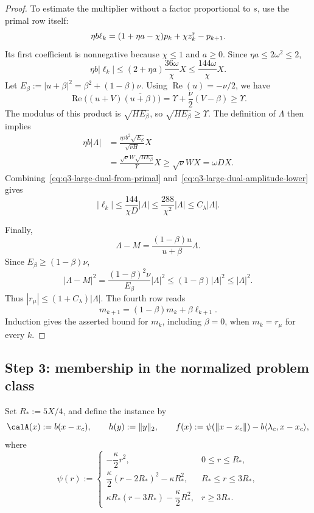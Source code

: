 \begin{proof}
To estimate the multiplier without a factor proportional to \(s\),
use the primal row itself:
\[
\eta b\ell_k=(1+\eta a-\chi)p_k+\chi z_k^{\rm r}-p_{k+1}.
\]
Its first coefficient is nonnegative because \(\chi\le1\) and
\(a\ge0\). Since \(\eta a\le2\omega^2\le2\),
\begin{equation}
\eta b|\ell_k|
\le(2+\eta a)\frac{36\omega}{\chi}X
\le\frac{144\omega}{\chi}X.
\label{eq:q3-large-dual-from-primal}
\end{equation}
Let \(E_\beta:=|u+\beta|^2=\beta^2+(1-\beta)\nu\).
Using \(\operatorname{Re}(u)=-\nu/2\), we have
\[
\operatorname{Re}\bigl((u+V)\overline{(u+\beta)}\bigr)
=\Upsilon+\frac{\nu}{2}(V-\beta)
\ge\Upsilon.
\]
The modulus of this product is \(\sqrt{HE_\beta}\), so
\(\sqrt{HE_\beta}\ge\Upsilon\). The definition of \(\Lambda\)
then implies
\begin{equation}
\begin{aligned}
\eta b|\Lambda|
&=\frac{\eta\tau b^2\sqrt{E_\beta}}{\sqrt{\nu H}}X\\
&=\frac{\sqrt{\nu}W\sqrt{HE_\beta}}{\Upsilon}X
\ge\sqrt{\nu}WX=\omega DX.
\end{aligned}
\label{eq:q3-large-dual-amplitude-lower}
\end{equation}
Combining~\eqref{eq:q3-large-dual-from-primal}
and~\eqref{eq:q3-large-dual-amplitude-lower} gives
\[
|\ell_k|
\le\frac{144}{\chi D}|\Lambda|
\le\frac{288}{\chi^2}|\Lambda|
\le C_\lambda|\Lambda|.
\]

Finally,
\[
\Lambda-M=\frac{(1-\beta)u}{u+\beta}\Lambda.
\]
Since \(E_\beta\ge(1-\beta)\nu\),
\[
|\Lambda-M|^2
=\frac{(1-\beta)^2\nu}{E_\beta}|\Lambda|^2
\le(1-\beta)|\Lambda|^2\le|\Lambda|^2.
\]
Thus \(|r_\mu|\le(1+C_\lambda)|\Lambda|\).
The fourth row reads
\[
m_{k+1}=(1-\beta)m_k+\beta\ell_{k+1}.
\]
Induction gives the asserted bound for \(m_k\), including
\(\beta=0\), when \(m_k=r_\mu\) for every \(k\).
\end{proof}

\subsection{Step 3: membership in the normalized problem class}
\label{subsec:q3-large-instance}

Set \(R_*:=5X/4\), and define the instance by
\begin{equation}
\calA(x):=b(x-x_c),\qquad
h(y):=\|y\|_2,\qquad
f(x):=\psi(\|x-x_c\|)-b\langle\lambda_c,x-x_c\rangle,
\label{eq:q3-large-instance}
\end{equation}
where
\begin{equation}
\psi(r):=
\begin{cases}
-\dfrac{\kappa}{2}r^2,&0\le r\le R_*,\\[3pt]
\dfrac{\kappa}{2}(r-2R_*)^2-\kappa R_*^2,
   &R_*\le r\le3R_*,\\[3pt]
\kappa R_*(r-3R_*)-\dfrac{\kappa}{2}R_*^2,
   &r\ge3R_*.
\end{cases}
\label{eq:q3-large-radial-extension}
\end{equation}

